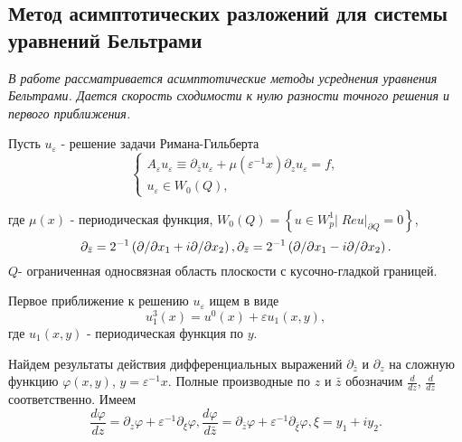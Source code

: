 
\subsection{Метод асимптотических разложений для системы уравнений Бельтрами}

\textit{
    В работе рассматривается асимптотические методы усреднения уравнения Бельтрами. Дается скорость сходимости к нулю разности точного решения и первого приближения.
}


Пусть $u_{\varepsilon }$ - решение задачи Римана-Гильберта
\begin{equation}
\label{sirM3.1_} \left\{\begin{array}{l} {A_{\varepsilon } u_{\varepsilon } \equiv \partial _{\bar{z}} u_{\varepsilon } +\mu (\varepsilon ^{-1} x)\partial _{z} u_{\varepsilon } =f,} \\ {u_{\varepsilon } \in W_{0} (Q),} \end{array}\right.
\end{equation}

где  $\mu (x)$ - периодическая функция,  $W_{0} (Q)=\left\{u\in W_{p}^{1} |\; Reu|_{\partial Q} =0\right\}$,
\begin{equation*}
\partial _{\bar{z}} =2^{-1} \left({\partial  \mathord{\left/{\vphantom{\partial  \partial x_{1} }}\right.\kern-\nulldelimiterspace} \partial x_{1} } +i{\partial  \mathord{\left/{\vphantom{\partial  \partial x_{2} }}\right.\kern-\nulldelimiterspace} \partial x_{2} } \right),  \partial _{\bar{z}} =2^{-1} \left({\partial  \mathord{\left/{\vphantom{\partial  \partial x_{1} }}\right.\kern-\nulldelimiterspace} \partial x_{1} } -i{\partial  \mathord{\left/{\vphantom{\partial  \partial x_{2} }}\right.\kern-\nulldelimiterspace} \partial x_{2} } \right).
\end{equation*}
$Q$- ограниченная односвязная область плоскости с кусочно-гладкой границей.

Первое приближение к решению $u_{\varepsilon } $ ищем в виде
\begin{equation}
u_{1}^{3} (x)=u^{0} (x)+\varepsilon u_{1} (x,y),\label{sirM3.2_}
\end{equation}
где $u_{1}(x,y)$ - периодическая функция по $y$.

Найдем результаты действия дифференциальных выражений $\partial _{\bar{z}} $ и $\partial _{z} $ на сложную функцию $\varphi (x,y)$, $y=\varepsilon ^{-1} x$. Полные производные по $z$ и $\bar{z}$ обозначим $\frac{d}{dz} $, $\frac{d}{d\bar{z}} $ соответственно. Имеем
\begin{equation*}
\frac{d\varphi }{dz} =\partial _{z} \varphi +\varepsilon ^{-1} \partial _{\xi } \varphi ,  \frac{d\varphi }{d\bar{z}} =\partial _{\bar{z}} \varphi +\varepsilon ^{-1} \partial _{\bar{\xi }} \varphi ,  \xi =y_{1} +iy_{2} .
\end{equation*}

